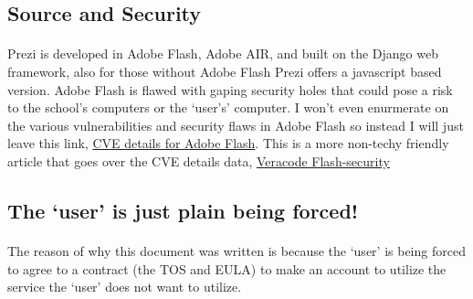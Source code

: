 \subsection{Source and Security}
\paragraph{}
Prezi\texttrademark{} is developed in Adobe Flash, Adobe AIR, and built on the
Django web framework, also for those without Adobe Flash Prezi\texttrademark{}
offers a javascript based version. Adobe Flash is flawed with gaping security
holes that could pose a risk to the school's computers or the `user's' computer.
I won't even enurmerate on the various vulnerabilities and security flaws in
Adobe Flash so instead I will just leave this link,
\href{http://www.cvedetails.com/vulnerability-list/vendor_id-53/product_id-6761/Adobe-Flash-Player.html}{CVE details for Adobe Flash}.
This is a more non-techy friendly article that goes over the CVE details data,
\href{http://www.veracode.com/security/flash-security}{Veracode Flash-security}
\par

\subsection{The `user' is just plain being forced!}
\paragraph{}
The reason of why this document was written is because the `user' is being
forced to agree to a contract (the TOS and EULA) to make an account to utilize
the service the `user' does not want to utilize.
\par
